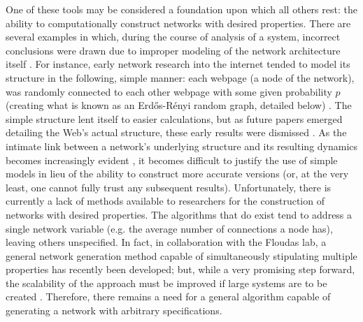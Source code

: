 \documentclass[11pt]{article}
\begin{document}
One of these tools may be considered a foundation upon which all others rest: the ability to computationally construct networks with desired properties. There are several examples in which, during the course of analysis of a system, incorrect conclusions were drawn due to improper modeling of the network architecture itself \cite{theinternetisscalefree,smallworld,etc.}. For instance, early network research into the internet tended to model its structure in the following, simple manner: each webpage (a node of the network), was randomly connected to each other webpage with some given probability $p$ (creating what is known as an Erd\H{o}s-R\'{e}nyi random graph, detailed below) \cite{stochastic_models_webgraph}. The simple structure lent itself to easier calculations, but as future papers emerged detailing the Web's actual structure, these early results were dismissed \cite{something,hopefully}. As the intimate link between a network's underlying structure and its resulting dynamics becomes increasingly evident \cite{barbasi,scalefree and/or barabasi global dynamics}, it becomes difficult to justify the use of simple models in lieu of the ability to construct more accurate versions (or, at the very least, one cannot fully trust any subsequent results). Unfortunately, there is currently a lack of methods available to researchers for the construction of networks with desired properties. The algorithms that do exist tend to address a single network variable (e.g. the average number of connections a node has), leaving others unspecified. In fact, in collaboration with the Floudas lab, a general network generation method capable of simultaneously stipulating multiple properties has recently been developed; but, while a very promising step forward, the scalability of the approach must be improved if large systems are to be created \cite{karthiksoptimizationpaper}. Therefore, there remains a need for a general algorithm capable of generating a network with arbitrary specifications.\vspace{1mm}\\
\end{document}
